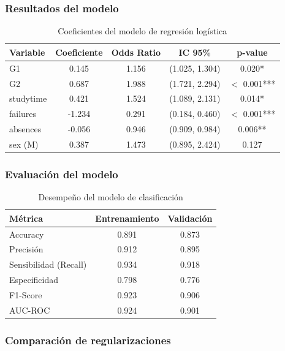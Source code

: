 \documentclass[a4paper,12pt]{article}
\begin{document}
\subsubsection{Resultados del modelo}

\begin{table}[H]
\centering
\begin{tabular}{lcccc}
\toprule
\textbf{Variable} & \textbf{Coeficiente} & \textbf{Odds Ratio} & \textbf{IC 95\%} & \textbf{p-value} \\
\midrule
G1 & 0.145 & 1.156 & (1.025, 1.304) & 0.020* \\
G2 & 0.687 & 1.988 & (1.721, 2.294) & $<$ 0.001*** \\
studytime & 0.421 & 1.524 & (1.089, 2.131) & 0.014* \\
failures & -1.234 & 0.291 & (0.184, 0.460) & $<$ 0.001*** \\
absences & -0.056 & 0.946 & (0.909, 0.984) & 0.006** \\
sex (M) & 0.387 & 1.473 & (0.895, 2.424) & 0.127 \\
\bottomrule
\end{tabular}
\caption{Coeficientes del modelo de regresión logística}
\label{tab:logistica_coef}
\end{table}

\subsubsection{Evaluación del modelo}

\begin{table}[H]
\centering
\begin{tabular}{lcc}
\toprule
\textbf{Métrica} & \textbf{Entrenamiento} & \textbf{Validación} \\
\midrule
Accuracy & 0.891 & 0.873 \\
Precisión & 0.912 & 0.895 \\
Sensibilidad (Recall) & 0.934 & 0.918 \\
Especificidad & 0.798 & 0.776 \\
F1-Score & 0.923 & 0.906 \\
AUC-ROC & 0.924 & 0.901 \\
\bottomrule
\end{tabular}
\caption{Desempeño del modelo de clasificación}
\label{tab:clasificacion_metricas}
\end{table}

\subsubsection{Comparación de regularizaciones}
\end{document}
